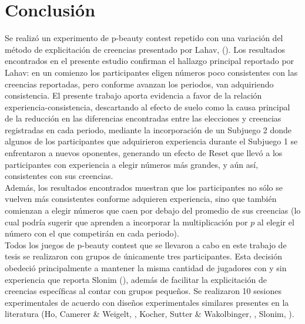 
\chapter{Conclusión} %

\label{Cap_Conclusion} %

Se realizó un experimento de p-beauty contest repetido con una variación del método de explicitación de creencias presentado por Lahav, (\citeyear{Lahav}). Los resultados encontrados en el presente estudio confirman el hallazgo principal reportado por Lahav: en un comienzo los participantes eligen números poco consistentes con las creencias reportadas, pero conforme avanzan los periodos, van adquiriendo consistencia. El presente trabajo aporta evidencia a favor de la relación experiencia-consistencia, descartando al efecto de suelo como la causa principal de la reducción en las diferencias encontradas entre las elecciones y creencias registradas en cada periodo, mediante la incorporación de un Subjuego 2 donde algunos de los participantes que adquirieron experiencia durante el Subjuego 1 se enfrentaron a nuevos oponentes, generando un efecto de Reset que llevó a los participantes con experiencia a elegir números más grandes, y aún así, consistentes con sus creencias.\\

Además, los resultados encontrados muestran que los participantes no sólo se vuelven más consistentes conforme adquieren experiencia, sino que también comienzan a elegir números que caen por debajo del promedio de sus creencias (lo cual podría sugerir que aprenden a incorporar la multiplicación por $p$ al elegir el número con el que competirán en cada periodo).\\

Todos los juegos de p-beauty contest que se llevaron a cabo en este trabajo de tesis se realizaron con grupos de únicamente tres participantes. Esta decisión obedeció principalmente a mantener la misma cantidad de jugadores con y sin experiencia que reporta Slonim (\citeyear{Slonim}), además de facilitar la explicitación de creencias específicas al contar con grupos pequeños. Se realizaron 10 sesiones experimentales de acuerdo con diseños experimentales similares presentes en la literatura (Ho, Camerer & Weigelt, \citeyear{Ho}, Kocher, Sutter & Wakolbinger, \citeyear{Kocher}, Slonim, \citeyear{Slonim}).\\ %

